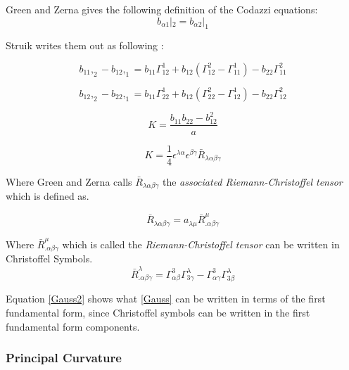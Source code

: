 Green and Zerna\cite{ref:GreenZerna} gives the following definition of the Codazzi
equations:
\begin{equation}
    b_{\alpha 1}|_2 = b_{\alpha 2}|_1 
\end{equation}

Struik writes them out as following \cite{ref:Struik}:

\begin{equation}
   b_{11},_2 - b_{12},_1 = b_{11} \Gamma^1_{12} + b_{12}(\Gamma^2_{12} - \Gamma^1_{11}) - b_{22}\Gamma^2_{11} 
\end{equation}

\begin{equation}
   b_{12},_2 - b_{22},_1 = b_{11} \Gamma^1_{22} + b_{12}(\Gamma^2_{22} - \Gamma^1_{12}) - b_{22}\Gamma^2_{12} 
\end{equation}


\begin{equation}\label{Gauss}
  K= \frac{b_{11}b_{22}-b^2_{12}}{a}
\end{equation}

\begin{equation}
  K= \frac{1}{4}\epsilon^{\lambda \alpha} \epsilon^{\beta \gamma} \bar{R}_{\lambda \alpha \beta \gamma}
\end{equation}

Where Green and Zerna calls $\bar{R}_{\lambda \alpha \beta \gamma}$ the  \textit{associated Riemann-Christoffel tensor} which is defined as.

\begin{equation}
 \bar{R}_{\lambda \alpha \beta \gamma} = a_{\lambda \mu} \bar{R}^\mu_{.\alpha \beta \gamma}
\end{equation}

 Where $\bar{R}^\mu_{.\alpha \beta \gamma}$ which is called the \textit{Riemann-Christoffel tensor} can be written in Christoffel Symbols.
\begin{equation} \label{Gauss2}
\bar{R}^\lambda_{.\alpha \beta \gamma} = \Gamma^3_{\alpha \beta} \Gamma^\lambda_{3\gamma}-\Gamma^3_{\alpha \gamma}\Gamma^\lambda_{3\beta} 
\end{equation}

Equation \ref{Gauss2} shows what \ref{Gauss} can be written in terms of the first fundamental form, since Christoffel symbols can be written in the first fundamental form components.


\subsubsection{Principal Curvature}

